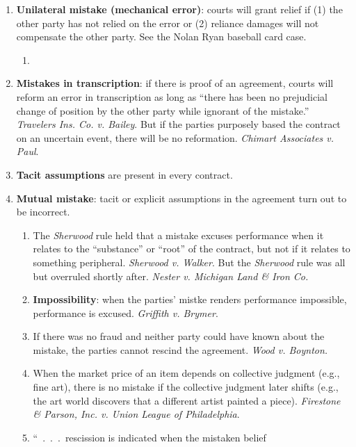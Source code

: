 \begin{enumerate}
    \item \textbf{Unilateral mistake (mechanical error)}: courts will grant 
    relief if (1) the other party has not relied on the error or (2) reliance 
    damages will not compensate the other party. See the Nolan Ryan baseball 
    card case. %
    \begin{enumerate}
        \item %
    \end{enumerate}
    \item \textbf{Mistakes in transcription}: if there is proof of an 
    agreement, courts will reform an error in transcription as long as ``there 
    has been no prejudicial change of position by the other party while 
    ignorant of the mistake.'' \emph{Travelers Ins. Co. v. Bailey}. But if the 
    parties purposely based the contract on an uncertain event, there will be 
    no reformation. \emph{Chimart Associates v. Paul}.
    \item \textbf{Tacit assumptions} are present in every contract.
    \item \textbf{Mutual mistake}: tacit or explicit assumptions in the 
    agreement turn out to be incorrect.
    \begin{enumerate}
        \item The \emph{Sherwood} rule held that a mistake excuses performance 
        when it relates to the ``substance'' or ``root'' of the contract, but 
        not if it relates to something peripheral. \emph{Sherwood v. Walker}. 
        But the \emph{Sherwood} rule was all but overruled shortly after. 
        \emph{Nester v. Michigan Land \& Iron Co.}
        \item \textbf{Impossibility}: when the parties' mistke renders 
        performance impossible, performance is excused. \emph{Griffith v. 
        Brymer}.
        \item If there was no fraud and neither party could have known about 
        the mistake, the parties cannot rescind the agreement. \emph{Wood v. 
        Boynton.}
        \item When the market price of an item depends on collective judgment 
        (e.g., fine art), there is no mistake if the collective judgment later 
        shifts (e.g., the art world discovers that a different artist painted 
        a piece). \emph{Firestone \& Parson, Inc. v. Union League of 
        Philadelphia}.
        \item ``~.~.~.~rescission is indicated when the mistaken belief 

\end{enumerate}
\end{enumerate}
